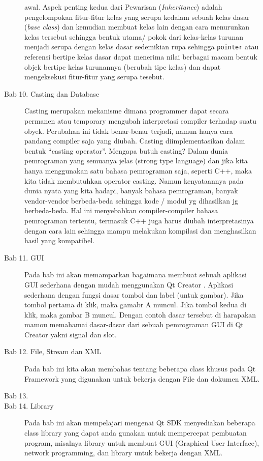 \begin{description}
awal. Aspek penting kedua dari Pewarisan (\emph{Inheritance}) adalah
pengelompokan fitur-fitur kelas yang serupa kedalam sebuah kelas dasar
(\emph{base class}) dan kemudian membuat kelas lain dengan cara
menurunkan kelas tersebut sehingga bentuk utama/ pokok dari kelas-kelas
turunan menjadi serupa dengan kelas dasar sedemikian rupa sehingga
\texttt{pointer} atau referensi bertipe kelas dasar dapat menerima nilai
berbagai macam bentuk objek bertipe kelas turunannya (berubah tipe
kelas) dan dapat mengeksekusi fitur-fitur yang serupa tesebut.
\item[Bab 10. Casting dan Database] Casting merupakan mekanisme dimana programmer dapat secara permanen atau
temporary mengubah interpretasi compiler terhadap suatu obyek. Perubahan
ini tidak benar-benar terjadi, namun hanya cara pandang compiler saja
yang diubah. Casting diimplementasikan dalam bentuk ``casting
operator''. Mengapa butuh casting? Dalam dunia pemrograman yang semuanya
jelas (strong type language) dan jika kita hanya menggunakan satu bahasa
pemrograman saja, seperti C++, maka kita tidak membutuhkan operator
casting. Namun kenyataannya pada dunia nyata yang kita hadapi, banyak
bahasa pemrograman, banyak vendor-vendor berbeda-beda sehingga kode /
modul yg dihasilkan jg berbeda-beda. Hal ini menyebabkan
compiler-compiler bahasa pemrograman tertentu, termasuk C++ juga harus
diubah interpretasinya dengan cara lain sehingga mampu melakukan
kompilasi dan menghasilkan hasil yang kompatibel.
\item[Bab 11. GUI] Pada bab ini akan memamparkan bagaimana membuat sebuah aplikasi GUI 
sederhana dengan mudah menggunakan Qt Creator . Aplikasi sederhana dengan
fungsi dasar tombol dan label (untuk gambar). Jika tombol pertama di klik, maka
gamabr A muncul. Jika tombol kedua di klik, maka gambar B muncul. Dengan
contoh dasar tersebut di harapakan mamou memahamai dasar-dasar dari sebuah
pemrograman GUI di Qt Creator yakni signal dan slot.
\item[Bab 12. File, Stream dan XML] Pada bab ini kita akan membahas 
tentang beberapa class khusus pada Qt Framework yang digunakan untuk
bekerja dengan File dan dokumen XML.
\item[Bab 13.]
\item[Bab 14. Library] Pada bab ini akan mempelajari mengenai Qt SDK
menyediakan beberapa class library yang dapat anda gunakan untuk
mempercepat pembuatan program, misalnya library untuk membuat GUI
(Graphical User Interface), network programming, dan library untuk
bekerja dengan XML.

\end{description}

